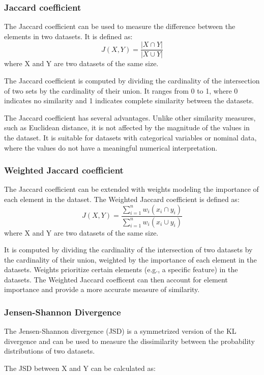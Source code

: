 \subsubsection{Jaccard coefficient}
The Jaccard coefficient can be used to measure the difference between the elements in two datasets.
It is defined as:\[J(X,Y) = \frac{|X \cap Y|}{|X \cup Y|}\]
where X and Y are two datasets of the same size.

The Jaccard coefficient is computed by dividing the cardinality of the intersection of two sets by the cardinality of their union. It ranges from 0 to 1, where 0 indicates no similarity and 1 indicates complete similarity between the datasets.

The Jaccard coefficient has several advantages. Unlike other similarity measures, such as Euclidean distance, it is not affected by the magnitude of the values in the dataset. It is suitable for datasets with categorical variables or nominal data, where the values do not have a meaningful numerical interpretation.

\subsubsection{Weighted Jaccard coefficient} 
The Jaccard coefficient can be extended with weights modeling the importance of each element in the dataset. 
The Weighted Jaccard coefficient is defined as:\[J(X,Y) = \frac{\sum_{i=1}^{n}w_i(x_i \cap y_i)}{\sum_{i=1}^{n}w_i(x_i \cup y_i)}\]
where X and Y are two datasets of the same size.

It is computed by dividing the cardinality of the intersection of two datasets by the cardinality of their union, weighted by the importance of each element in the datasets. Weights prioritize certain elements (e.g., a specific feature) in the datasets.
The Weighted Jaccard coefficent can then account for element importance and provide a more accurate measure of similarity.

\subsubsection{Jensen-Shannon Divergence}
The Jensen-Shannon divergence (JSD) is a symmetrized version of the KL divergence and can be used to measure the dissimilarity between the probability distributions of two datasets. 

The JSD between X and Y can be calculated as:

